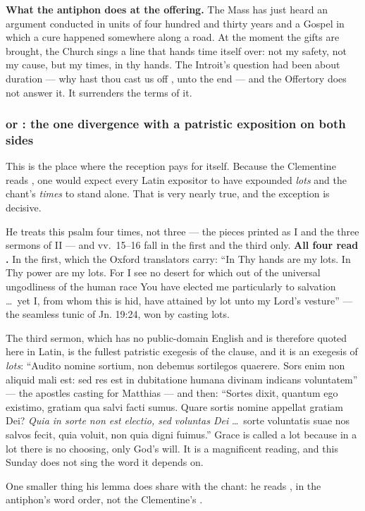 \textbf{What the antiphon does at the offering.} The Mass has just heard an
argument conducted in units of four hundred and thirty years and a Gospel in
which a cure happened somewhere along a road. At the moment the gifts are
brought, the Church sings a line that hands time itself over: not my safety,
not my cause, but my times, in thy hands. The Introit's question had been about
duration --- why hast thou cast us off , unto the end --- and
the Offertory does not answer it. It surrenders the terms of it.

\subsubsection*{ or : the one divergence with a
patristic exposition on both sides}

This is the place where the reception pays for itself. Because the Clementine
reads , one would expect every Latin expositor to have expounded
\textit{lots} and the chant's \textit{times} to stand alone. That is very
nearly true, and the exception is decisive.

\begin{witnessnote}
He treats this psalm four times, not three --- the pieces printed as
 I and the three sermons of  II --- and
vv.~15--16 fall in the first and the third only. \textbf{All four read
.} In the first, which the Oxford
translators carry: ``In Thy hands are my lots. In Thy power are my lots. For I
see no desert for which out of the universal ungodliness of the human race You
have elected me particularly to salvation \dots\ yet I, from whom this is hid,
have attained by lot unto my Lord's vesture'' --- the seamless tunic of
Jn. 19:24, won by casting lots.

The third sermon, which has no public-domain English and is therefore quoted
here in Latin, is the fullest patristic exegesis of the clause, and it is an
exegesis of \emph{lots}: ``Audito nomine sortium, non debemus sortilegos
quaerere. Sors enim non aliquid mali est: sed res est in dubitatione humana
divinam indicans voluntatem'' --- the apostles casting for Matthias --- and
then: ``Sortes dixit, quantum ego existimo, gratiam qua salvi facti sumus.
Quare sortis nomine appellat gratiam Dei? \emph{Quia in sorte non est electio,
sed voluntas Dei} \dots\ sorte voluntatis suae nos salvos fecit, quia voluit,
non quia digni fuimus.'' Grace is called a lot because in a lot there is no
choosing, only God's will. It is a magnificent reading, and this Sunday does
not sing the word it depends on.

One smaller thing his lemma does share with the chant: he reads , in the antiphon's word order, not the Clementine's .
\end{witnessnote}

